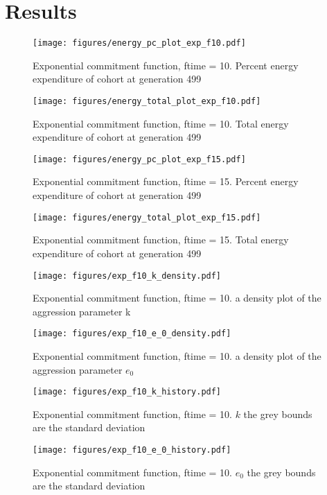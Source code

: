 \documentclass[a4paper,11pt]{article}
\begin{document}
\section{Results} %
\label{sec:results}
\begin{figure}[h!]
    \centering
    \texttt{[image: figures/energy\_pc\_plot\_exp\_f10.pdf]}
    \caption{Exponential commitment function, ftime = 10. Percent energy expenditure of cohort at generation 499}
    \label{fig:energy pc}

    \centering
    \texttt{[image: figures/energy\_total\_plot\_exp\_f10.pdf]}
    \caption{Exponential commitment function, ftime = 10. Total energy expenditure of cohort at generation 499}
    \label{fig:energy total}
\end{figure}
\clearpage

\begin{figure}[h!]
    \centering
    \texttt{[image: figures/energy\_pc\_plot\_exp\_f15.pdf]}
    \caption{Exponential commitment function, ftime = 15. Percent energy expenditure of cohort at generation 499}
    \label{fig:var energy pc}
    \centering

    \texttt{[image: figures/energy\_total\_plot\_exp\_f15.pdf]}
    \caption{Exponential commitment function, ftime = 15. Total energy expenditure of cohort at generation 499}
    \label{fig:var energy total}
\end{figure}


\begin{figure}[h!]
    \centering
    \texttt{[image: figures/exp\_f10\_k\_density.pdf]}
    \caption{Exponential commitment function, ftime = 10. a density plot of the aggression parameter k}
    \label{fig:k density}

    \texttt{[image: figures/exp\_f10\_e\_0\_density.pdf]}
    \caption{Exponential commitment function, ftime = 10. a density plot of the aggression parameter $e_0$}
    \label{fig:e_0 density}
\end{figure}

\begin{figure}[h!]
    \centering
    \texttt{[image: figures/exp\_f10\_k\_history.pdf]}
    \caption{Exponential commitment function, ftime = 10. $k$ the grey bounds are the standard deviation}
    \label{fig:k history}

    \texttt{[image: figures/exp\_f10\_e\_0\_history.pdf]}
    \caption{ Exponential commitment function, ftime = 10. $e_0$ the grey bounds are the standard deviation}
    \label{fig:e_0 history}
\end{figure}
\end{document}

